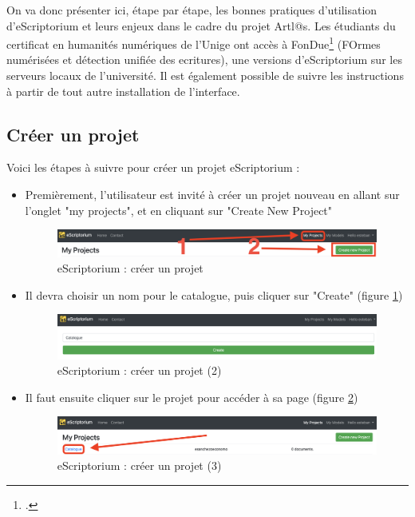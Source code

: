 \documentclass[a4paper,12pt,twoside]{book}
\begin{document}
On va donc présenter ici, étape par étape, les bonnes pratiques d'utilisation d'eScriptorium et leurs enjeux dans le cadre du projet Artl@s. Les étudiants du certificat en humanités numériques de l'Unige ont accès à FonDue\footcite{FoNDUE} (FOrmes numérisées et détection unifiée des ecritures), une versions d'eScriptorium sur les serveurs locaux de l'université. Il est également possible de suivre les instructions à partir de tout autre installation de l'interface.


\subsection{Créer un projet}

Voici les étapes à suivre pour créer un projet eScriptorium :

\begin{itemize}
	
\item Premièrement, l'utilisateur est invité à créer un projet nouveau en allant sur l'onglet "my projects", et en cliquant sur "Create New Project" 
\begin{figure}[ht]
	\centering
	\includegraphics[scale=0.3]{projet_eScriptorium.png}		
	\caption{eScriptorium : créer un projet}
\end{figure}

\item Il devra choisir un nom pour le catalogue, puis cliquer sur "Create" (figure \ref{create1})
\begin{figure}[ht]
	\centering
	\includegraphics[scale=0.3]{create_eScriptorium.png}		
	\caption{eScriptorium : créer un projet (2)}
	\label{create1}
\end{figure}

\item Il faut ensuite cliquer sur le projet pour accéder à sa page (figure \ref{create3})
\begin{figure}[ht]
	\centering
	\includegraphics[scale=0.3]{document_eScriptorium.png}		
	\caption{eScriptorium : créer un projet (3)}
	\label{create3}
\end{figure}


\end{itemize}
\end{document}
